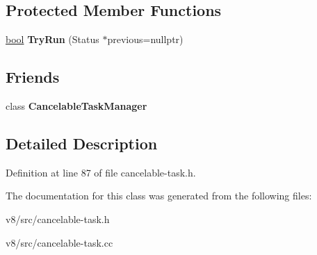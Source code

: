 \subsection*{Protected Member Functions}
\begin{DoxyCompactItemize}
\item 
\mbox{\label{classv8_1_1internal_1_1Cancelable_af46b0c5cafa45306e10034d264efa95d}} 
\mbox{\hyperlink{classbool}{bool}} {\bfseries Try\+Run} (Status $\ast$previous=nullptr)
\end{DoxyCompactItemize}
\subsection*{Friends}
\begin{DoxyCompactItemize}
\item 
\mbox{\label{classv8_1_1internal_1_1Cancelable_a76c51416f37d4d74c9557fb203b8ccf3}} 
class {\bfseries Cancelable\+Task\+Manager}
\end{DoxyCompactItemize}


\subsection{Detailed Description}


Definition at line 87 of file cancelable-\/task.\+h.



The documentation for this class was generated from the following files\+:\begin{DoxyCompactItemize}
\item 
v8/src/cancelable-\/task.\+h\item 
v8/src/cancelable-\/task.\+cc\end{DoxyCompactItemize}
